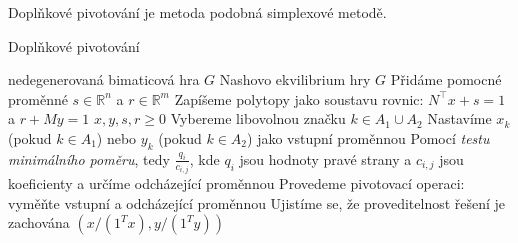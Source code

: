 \begin{definition}
\label{def:complementary_pivot}
Doplňkové pivotování je metoda podobná simplexové metodě. 


\begin{algorithm}
    \algrenewcommand{}
    \algrenewcommand{}
    \caption{Doplňkové pivotování}
    \begin{algorithmic}
        \Require  nedegenerovaná bimaticová hra $G$ 
        \Ensure  Nashovo ekvilibrium hry $G$
        \State Přidáme pomocné proměnné $s \in \mathbb{R}^n$ a $r \in \mathbb{R}^m$
        \State Zapíšeme polytopy jako soustavu rovnic:
        \State \hspace{1cm} $N^\top x + s = 1$ a $r + M y = 1$
        \State \hspace{1cm} $x, y, s, r \geq 0$
        \State Vybereme libovolnou značku $k \in A_1 \cup A_2$
        \State Nastavíme $x_k$ (pokud $k \in A_1$) nebo $y_k$ (pokud $k \in A_2$) jako vstupní proměnnou
        \State Pomocí \textit{testu minimálního poměru}, tedy $\frac{q_i}{c_{i,j}}$, kde $q_i$ jsou hodnoty pravé strany a $c_{i,j}$ jsou koeficienty a určíme odcházející proměnnou
        \State Provedeme pivotovací operaci: vyměňte vstupní a odcházející proměnnou
        \State Ujistíme se, že proveditelnost řešení je zachována
        \EndWhile
        \State \Return $(x/(1^T x), y/(1^T y))$
    \end{algorithmic}
\end{algorithm}
\end{definition}
